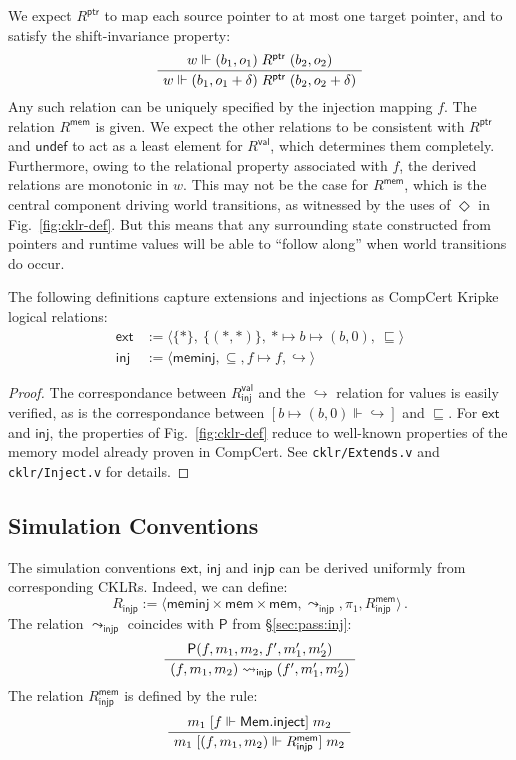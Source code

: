 \documentclass[sigplan,10pt,review,anonymous]{acmart}
\newcommand{\kw}[1]{\ensuremath{ \mathsf{#1} }}
\newcommand{\ifr}[1]{\mathrel{[{#1}]}}
\begin{document}
We expect $R^\kw{ptr}$ to map
each source pointer to at most one target pointer,
and to satisfy the shift-invariance property:
\[
  \AxiomC{$w \Vdash (b_1, o_1) \mathrel{R^\kw{ptr}} (b_2, o_2)$}
  \UnaryInfC{$w \Vdash (b_1, o_1 + \delta) \mathrel{R^\kw{ptr}} (b_2, o_2 + \delta)$}
  \DisplayProof
\]
Any such relation can be uniquely specified by
the injection mapping $f$.
The relation $R^\kw{mem}$ is given.
We expect the other relations to be consistent with $R^\kw{ptr}$
and $\kw{undef}$ to act as a least element for $R^\kw{val}$,
which determines them completely.
Furthermore, owing to the relational property associated with $f$,
the derived relations are monotonic in $w$.
This may not be the case for $R^\kw{mem}$,
which is the central component driving world transitions,
as witnessed by the uses of $\Diamond$ in Fig.~\ref{fig:cklr-def}.
But this means that any surrounding state
constructed from pointers and runtime values
will be able to ``follow along'' when
world transitions do occur.

\begin{theorem}
The following definitions capture extensions and
injections as CompCert Kripke logical relations:
\begin{align*}
  \kw{ext} &:=
    \langle \{*\}, \: \{(*,*)\}, \: * \mapsto b \mapsto (b, 0), \:
    {\sqsubseteq} \rangle
  \\
  \kw{inj} &:=
    \langle \kw{meminj}, {\subseteq}, f \mapsto f, {\hookrightarrow} \rangle
\end{align*}
\begin{proof}
The correspondance between $R^\kw{val}_\kw{inj}$ and
the $\hookrightarrow$ relation for values is easily verified,
as is the correspondance between
$[b \mapsto (b, 0) \Vdash {\hookrightarrow}]$ and $\sqsubseteq$.
For \kw{ext} and \kw{inj},
the properties of Fig.~\ref{fig:cklr-def}
reduce to well-known properties of the memory model
already proven in CompCert.
See \texttt{cklr/Extends.v} and \texttt{cklr/Inject.v}
for details.
\end{proof}
\end{theorem}


\subsection{Simulation Conventions} %

The simulation conventions \kw{ext}, \kw{inj} and \kw{injp}
can be derived uniformly from corresponding CKLRs.
Indeed, we can define:
\[
  R_\kw{injp} :=
    \langle
      \kw{meminj} \times \kw{mem} \times \kw{mem},
      \leadsto_\kw{injp}, \pi_1, R_\kw{injp}^\kw{mem}
    \rangle \,.
\]
The relation $\leadsto_\kw{injp}$
coincides with $\kw{P}$ from \S\ref{sec:pass:inj}:
\[
  \AxiomC{$\kw{P}(f, m_1, m_2, f', m_1', m_2')$}
  \UnaryInfC{$(f, m_1, m_2) \leadsto_\kw{injp} (f', m_1', m_2')$}
  \DisplayProof
\]
The relation $R_\kw{injp}^\kw{mem}$ is defined by the rule:
\[
  \AxiomC{$m_1 \ifr{f \Vdash \kw{Mem.inject}} m_2$}
  \UnaryInfC{$m_1 \ifr{(f, m_1, m_2) \Vdash R_\kw{injp}^\kw{mem}} m_2$}
  \DisplayProof
\]
\end{document}
